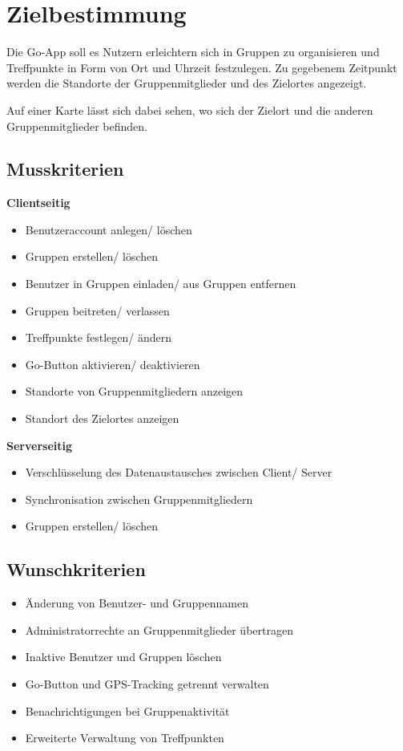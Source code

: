 \section{Zielbestimmung}
Die Go-App soll es Nutzern erleichtern sich in Gruppen zu organisieren
und Treffpunkte in Form von Ort und Uhrzeit festzulegen. Zu gegebenem Zeitpunkt werden die Standorte der Gruppenmitglieder und des Zielortes angezeigt.


Auf einer Karte lässt sich dabei sehen, wo sich der Zielort und die anderen Gruppenmitglieder befinden.

\subsection{Musskriterien}
\textbf{Clientseitig}
\begin{itemize}
	\item Benutzeraccount anlegen/ löschen
	\item Gruppen erstellen/ löschen
	\item Benutzer in Gruppen einladen/ aus Gruppen entfernen
	\item Gruppen beitreten/ verlassen
	\item Treffpunkte festlegen/ ändern
	\item Go-Button aktivieren/ deaktivieren
	\item Standorte von Gruppenmitgliedern anzeigen
	\item Standort des Zielortes anzeigen
\end{itemize}
\textbf{Serverseitig}
\begin{itemize}
	\item Verschlüsselung des Datenaustausches zwischen Client/ Server
	\item Synchronisation zwischen Gruppenmitgliedern
	\item Gruppen erstellen/ löschen
\end{itemize}

\subsection{Wunschkriterien}
\begin{itemize}
	\item Änderung von Benutzer- und Gruppennamen
	\item Administratorrechte an Gruppenmitglieder übertragen
	\item Inaktive Benutzer und Gruppen löschen
	\item Go-Button und GPS-Tracking getrennt verwalten
	\item Benachrichtigungen bei Gruppenaktivität
	\item Erweiterte Verwaltung von Treffpunkten
\end{itemize}

